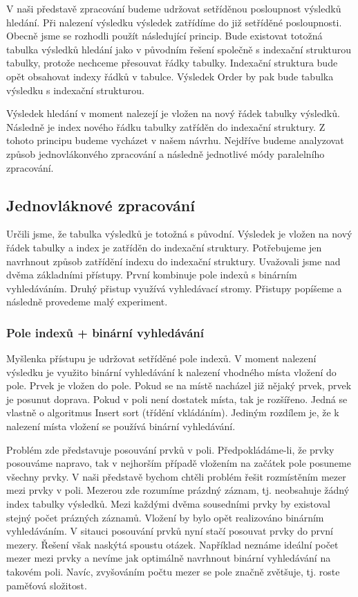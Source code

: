 V naši představě zpracování budeme udržovat setříděnou posloupnost výsledků hledání.
Při nalezení výsledku výsledek zatřídíme do již setříděné posloupnosti.
Obecně jsme se rozhodli použít následující princip.
Bude existovat totožná tabulka výsledků hledání jako v původním řešení společně s indexační strukturou tabulky, protože nechceme přesouvat řádky tabulky.
Indexační struktura bude opět obsahovat indexy řádků v tabulce.
Výsledek Order by pak bude tabulka výsledku s indexační strukturou.

Výsledek hledání v moment nalezejí je vložen na nový řádek tabulky výsledků.
Následně je index nového řádku tabulky zatříděn do indexační struktury.
Z tohoto principu budeme vycházet v našem návrhu.
Nejdříve budeme analyzovat způsob jednovlákonvého zpracování a následně jednotlivé módy paralelního zpracování.

\subsection{Jednovláknové zpracování} \label{anal.ordeby.single}

Určili jsme, že tabulka výsledků je totožná s původní.
Výsledek je vložen na nový řádek tabulky a index je zatříděn do indexační struktury.
Potřebujeme jen navrhnout způsob zatřídění indexu do indexační struktury.
Uvažovali jsme nad dvěma základními přístupy.
První kombinuje pole indexů s binárním vyhledáváním.
Druhý přistup využívá vyhledávací stromy.
Přistupy popíšeme a následně provedeme malý experiment.

\subsubsection{Pole indexů + binární vyhledávání}

Myšlenka přístupu je udržovat setříděné pole indexů. 
V moment nalezení výsledku je využito binární vyhledávání \citep[str. 26]{labyrint} k nalezení vhodného místa vložení do pole.
Prvek je vložen do pole.
Pokud se na místě nacházel již nějaký prvek, prvek je posunut doprava.
Pokud v poli není dostatek místa, tak je rozšířeno.
Jedná se vlastně o algoritmus Insert sort (třídění vkládáním).
Jediným rozdílem je, že k nalezení místa vložení se používá binární vyhledávání.

Problém zde představuje posouvání prvků v poli.
Předpokládáme-li, že prvky posouváme napravo, tak v nejhorším případě vložením na začátek pole posuneme všechny prvky.
V naši představě bychom chtěli problém řešit rozmístěním mezer mezi prvky v poli.
Mezerou zde rozumíme prázdný záznam, tj. neobsahuje žádný index tabulky výsledků.
Mezi každými dvěma sousedními prvky by existoval stejný počet prázných záznamů.
Vložení by bylo opět realizováno binárním vyhledáváním.
V sitauci posouvání prvků nyní stačí posouvat prvky do první mezery.
Řešení však naskýtá spoustu otázek.
Například neznáme ideální počet mezer mezi prvky a nevíme jak optimálně navrhnout binární vyhledávání na takovém poli.
Navíc, zvyšováním počtu mezer se pole značně zvětšuje, tj. roste paměťová složitost.


